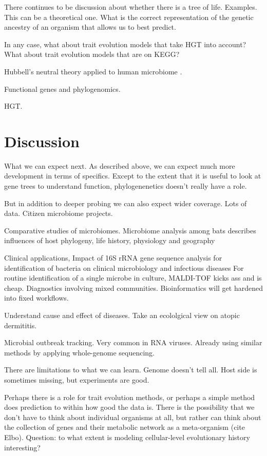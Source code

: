 \documentclass{amsart}
\begin{document}
There continues to be discussion about whether there is a tree of life.
Examples.
This can be a theoretical one.
What is the correct representation of the genetic ancestry of an organism that allows us to best predict.

In any case, what about trait evolution models that take HGT into account?
What about trait evolution models that are on KEGG?

Hubbell's neutral theory applied to human microbiome \cite{fierer2012animalcules,costello2012application}.

Functional genes and phylogenomics.

HGT.



\section{Discussion}
What we can expect next.
As described above, we can expect much more development in terms of specifics.
\cite{hooper2012interactions}
Except to the extent that it is useful to look at gene trees to understand function, phylogenenetics doesn't really have a role.

But in addition to deeper probing we can also expect wider coverage.
Lots of data.
Citizen microbiome projects.

Comparative studies of microbiomes.
\cite{phillips2012microbiome}
Microbiome analysis among bats describes influences of host phylogeny, life history, physiology and geography

Clinical applications,
\cite{clarridge2004}
{{I}mpact of 16{S} r{RNA} gene sequence analysis for identification of bacteria on clinical microbiology and infectious diseases}
For routine identification of a single microbe in culture, MALDI-TOF kicks ass and is cheap.
Diagnostics involving mixed communities.
Bioinformatics will get hardened into fixed workflows.

Understand cause and effect of diseases.
Take an ecololgical view on atopic dermititis.

Microbial outbreak tracking.
Very common in RNA viruses.
Already using similar methods by applying whole-genome sequencing.

There are limitations to what we can learn.
Genome doesn't tell all.
Host side is sometimes missing, but experiments are good.

Perhaps there is a role for trait evolution methods, or perhaps a simple method does prediction to within how good the data is.
There is the possibility that we don't have to think about individual organisms at all, but rather can think about the collection of genes and their metabolic network as a meta-organism (cite Elbo).
Question: to what extent is modeling cellular-level evolutionary history interesting?
\end{document}
